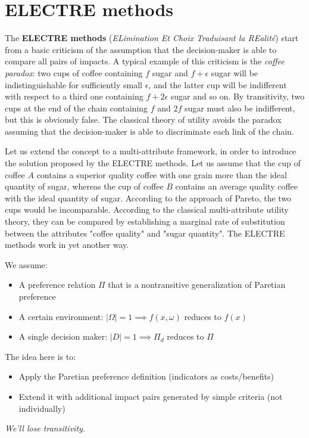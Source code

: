 \section{ELECTRE methods}
\label{sec:electre}

The \textbf{ELECTRE methods} (\textit{ELimination Et Choix Traduisant la REalité}) start from a basic criticism of the assumption that the decision-maker is able to compare all pairs of impacts. A typical example of this criticism is the \textit{coffee paradox}: two cups of coffee containing $f$ sugar and $f + \epsilon$ sugar will be indistinguishable for sufficiently small $\epsilon$, and the latter cup will be indifferent with respect to a third one containing $f + 2 \epsilon$ sugar and so on. By transitivity, two cups at the end of the chain containing $f$ and $2f$ sugar must also be indifferent, but this is obviously false. The classical theory of utility avoids the paradox assuming that the decision-maker is able to discriminate each link of the chain.

Let us extend the concept to a multi-attribute framework, in order to introduce the solution proposed by the ELECTRE methods. Let us assume that the cup of coffee $A$ contains a superior quality coffee with one grain more than the ideal quantity of sugar, whereas the cup of coffee $B$ contains an average quality coffee with the ideal quantity of sugar. According to the approach of Pareto, the two cups would be incomparable. According to the classical multi-attribute utility theory, they can be compared by establishing a marginal rate of substitution between the
attributes "coffee quality" and "sugar quantity". The ELECTRE methods work in yet another way.

We assume:
\begin{itemize}
	\item A preference relation $\Pi$ that is a nontransitive generalization of Paretian preference
	
	\item A certain environment: $|\Omega| = 1 \implies f(x, \omega)$ reduces to $f(x)$
	
	\item A single decision maker: $|D| = 1 \implies \Pi_d$ reduces to $\Pi$
\end{itemize}

The idea here is to:
\begin{itemize}
	\item Apply the Paretian preference definition (indicators as costs/benefits)
	
	\item Extend it with additional impact pairs generated by simple criteria (not individually)
\end{itemize}
\textit{We'll lose transitivity.}

